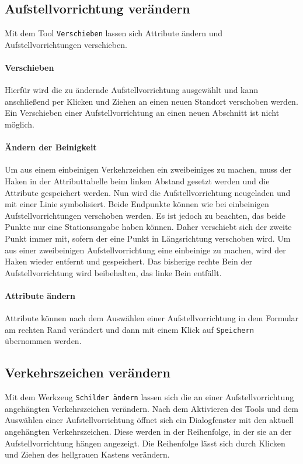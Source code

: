 \documentclass[a4paper,11pt,bibliography=totoc, listof=totoc,titlepage]{scrartcl}
\begin{document}
\subsection{Aufstellvorrichtung verändern}
Mit dem Tool \verb|Verschieben| lassen sich Attribute ändern und Aufstellvorrichtungen verschieben. 

\paragraph{Verschieben} 
Hierfür wird die zu ändernde Aufstellvorrichtung ausgewählt und kann anschließend per Klicken und Ziehen an einen neuen Standort verschoben werden. Ein Verschieben einer Aufstellvorrichtung an einen neuen Abschnitt ist nicht möglich.

\paragraph{Ändern der Beinigkeit}
Um aus einem einbeinigen Verkehrzeichen ein zweibeiniges zu machen, muss der Haken in der Attributtabelle beim linken Abstand gesetzt werden und die Attribute gespeichert werden. Nun wird die Aufstellvorrichtung neugeladen und mit einer Linie symbolisiert. Beide Endpunkte können wie bei einbeinigen Aufstellvorrichtungen verschoben werden. Es ist jedoch zu beachten, das beide Punkte nur eine Stationsangabe haben können. Daher verschiebt sich der zweite Punkt immer mit, sofern der eine Punkt in Längsrichtung verschoben wird. Um aus einer zweibeinigen Aufstellvorrichtung eine einbeinige zu machen, wird der Haken wieder entfernt und gespeichert. Das bisherige rechte Bein der Aufstellvorrichtung wird beibehalten, das linke Bein entfällt.

\paragraph{Attribute ändern}
Attribute können nach dem Auswählen einer Aufstellvorrichtung in dem Formular am rechten Rand verändert und dann mit einem Klick auf \verb|Speichern| übernommen werden.

\subsection{Verkehrszeichen verändern}
Mit dem Werkzeug \verb|Schilder ändern| lassen sich die an einer Aufstellvorrichtung angehäng\-ten Verkehrszeichen verändern. Nach dem Aktivieren des Tools und dem  Auswählen einer Aufstellvorrichtung öffnet sich ein Dialogfenster mit den aktuell angehängten Verkehrszeichen. Diese werden in der Reihenfolge, in der sie an der Aufstellvorrichtung hängen angezeigt. Die Reihenfolge lässt sich durch Klicken und Ziehen des hellgrauen Kastens verändern.
\end{document}
